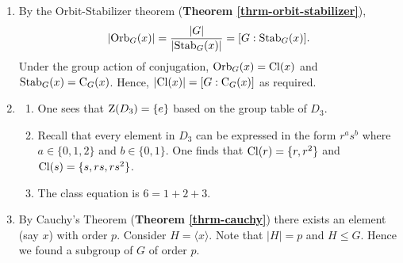 \begin{enumerate}
	\item By the Orbit-Stabilizer theorem (\textbf{Theorem \ref{thrm-orbit-stabilizer}}),
	\[
        |\mathrm{Orb}_{G}(x)| = \frac{|G|}{|\mathrm{Stab}_{G}(x)|} = [G : \mathrm{Stab}_{G}(x)]	.
	\]
	Under the group action of conjugation, $\mathrm{Orb}_{G}(x) = \mathrm{Cl}(x)$ and $\mathrm{Stab}_{G}(x) = \mathrm{C}_{G}(x)$. Hence, $|\mathrm{Cl}(x)| = [G : \mathrm{C}_{G}(x)]	$ as required.

	\item \begin{enumerate}[label=(\alph*)]
	    \item One sees that $\mathrm{Z}(D_3) = \{e\}$ based on the group table of $D_3$.
	    \item Recall that every element in $D_3$ can be expressed in the form $r^as^b$ where $a \in \{0, 1, 2\}$ and $b \in \{0, 1\}$. One finds that $\mathrm{Cl}(r) = \{r, r^2\}$ and $\mathrm{Cl}(s) = \{s, rs, rs^2\}$.
	    \item The class equation is $6 = 1 + 2 + 3$.
	\end{enumerate}

	\item By Cauchy's Theorem (\textbf{Theorem \ref{thrm-cauchy}}) there exists an element (say $x$) with order $p$. Consider $H = \langle x \rangle$. Note that $|H| = p$ and $H \leq G$. Hence we found a subgroup of $G$ of order $p$.
\end{enumerate}


